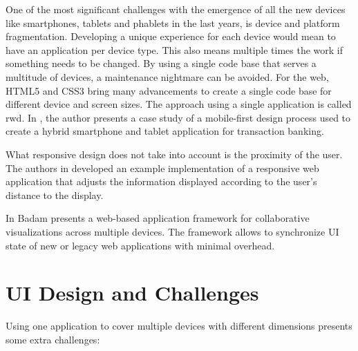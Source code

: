 \documentclass{sigchi}
\begin{document}
One of the most significant challenges with the emergence of all the new devices like smartphones, tablets and phablets in the last years, is device and platform fragmentation.
Developing a unique experience for each device would mean to have an application per device type.
This also means multiple times the work if something needs to be changed. 
By using a single code base that serves a multitude of devices, a maintenance nightmare can be avoided.
For the web, HTML5 and CSS3 bring many advancements to create a single code base for different device and screen sizes.
The approach using a single application is called \gls{rwd}.
In \cite{Pandey:2013:RDT:2525194.2525271}, the author presents a case study of a mobile-first design process used to create a hybrid smartphone and tablet application for transaction banking.

What responsive design does not take into account is the proximity of the user. 
The authors in \cite{Sukale:2014:PWD:2638728.2638768} developed an example implementation of a responsive web application that adjusts the information displayed according to the user's distance to the display.

In \cite{Badam:2014:PCF:2669485.2669518} Badam presents a web-based application framework for collaborative visualizations across multiple devices. The framework allows to synchronize UI state of new or legacy web applications with minimal overhead.


\section{UI Design and Challenges}
Using one application to cover multiple devices with different dimensions presents some extra challenges:
\end{document}
